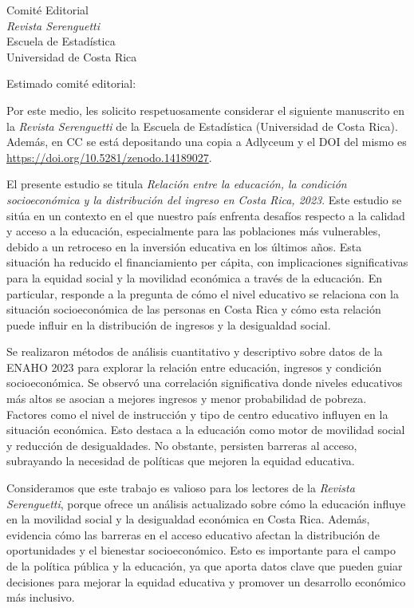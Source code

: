 \documentclass[11pt]{letter}
\date{\today}
\begin{document}
\begin{letter}{Comité Editorial\\ \textit{Revista Serenguetti}\\ Escuela de Estadística\\ Universidad de Costa Rica}

\opening{Estimado comité editorial:}

Por este medio, les solicito respetuosamente considerar el siguiente manuscrito en la \textit{Revista Serenguetti} de la Escuela de Estadística (Universidad de Costa Rica). Además, en CC se está depositando una copia a Adlyceum y el DOI del mismo es \href{https://doi.org/10.5281/zenodo.14189027}{https://doi.org/10.5281/zenodo.14189027}.

El presente estudio se titula \textit{Relación entre la educación, la condición socioeconómica y la distribución del ingreso en Costa Rica, 2023}. Este estudio se sitúa en un contexto en el que nuestro país enfrenta desafíos respecto a la calidad y acceso a la educación, especialmente para las poblaciones más vulnerables, debido a un retroceso en la inversión educativa en los últimos años. Esta situación ha reducido el financiamiento per cápita, con implicaciones significativas para la equidad social y la movilidad económica a través de la educación. En particular, responde a la pregunta de cómo el nivel educativo se relaciona con la situación socioeconómica de las personas en Costa Rica y cómo esta relación puede influir en la distribución de ingresos y la desigualdad social.

Se realizaron métodos de análisis cuantitativo y descriptivo sobre datos de la ENAHO 2023 para explorar la relación entre educación, ingresos y condición socioeconómica. Se observó una correlación significativa donde niveles educativos más altos se asocian a mejores ingresos y menor probabilidad de pobreza. Factores como el nivel de instrucción y tipo de centro educativo influyen en la situación económica. Esto destaca a la educación como motor de movilidad social y reducción de desigualdades. No obstante, persisten barreras al acceso, subrayando la necesidad de políticas que mejoren la equidad educativa.

Consideramos que este trabajo es valioso para los lectores de la \textit{Revista Serenguetti}, porque ofrece un análisis actualizado sobre cómo la educación influye en la movilidad social y la desigualdad económica en Costa Rica. Además, evidencia cómo las barreras en el acceso educativo afectan la distribución de oportunidades y el bienestar socioeconómico. Esto es importante para el campo de la política pública y la educación, ya que aporta datos clave que pueden guiar decisiones para mejorar la equidad educativa y promover un desarrollo económico más inclusivo.


\end{letter}
\end{document}
